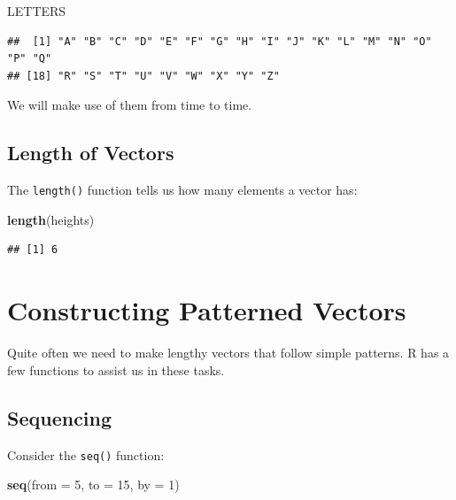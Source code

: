 \documentclass[]{book}
\makeatletter
\newenvironment{Shaded}{\begin{snugshade}}{\end{snugshade}}
\newcommand{\KeywordTok}[1]{\textcolor[rgb]{0.13,0.29,0.53}{\textbf{#1}}}
\newcommand{\DataTypeTok}[1]{\textcolor[rgb]{0.13,0.29,0.53}{#1}}
\newcommand{\DecValTok}[1]{\textcolor[rgb]{0.00,0.00,0.81}{#1}}
\newcommand{\NormalTok}[1]{#1}
\newenvironment{kframe}{%
\medskip{}
\setlength{\fboxsep}{.8em}
 \def\at@end@of@kframe{}%
 \ifinner\ifhmode%
  \def\at@end@of@kframe{\end{minipage}}%
  \begin{minipage}{\columnwidth}%
 \fi\fi%
 \def\FrameCommand##1{\hskip\@totalleftmargin \hskip-\fboxsep
 \colorbox{shadecolor}{##1}\hskip-\fboxsep
     \hskip-\linewidth \hskip-\@totalleftmargin \hskip\columnwidth}%
 \MakeFramed {\advance\hsize-\width
   \@totalleftmargin\z@ \linewidth\hsize
   \@setminipage}}%
 {\par\unskip\endMakeFramed%
 \at@end@of@kframe}
\renewenvironment{Shaded}{\begin{kframe}}{\end{kframe}}
\theoremstyle{definition}
\theoremstyle{definition}
\theoremstyle{definition}
\theoremstyle{remark}
\makeatother
\begin{document}
\begin{Shaded}
\begin{Highlighting}[]
\NormalTok{LETTERS}
\end{Highlighting}
\end{Shaded}

\begin{verbatim}
##  [1] "A" "B" "C" "D" "E" "F" "G" "H" "I" "J" "K" "L" "M" "N" "O" "P" "Q"
## [18] "R" "S" "T" "U" "V" "W" "X" "Y" "Z"
\end{verbatim}

We will make use of them from time to
time.

\subsection{Length of Vectors}\label{length-of-vectors}

The \texttt{length()}
function tells us how many
elements a vector has:

\begin{Shaded}
\begin{Highlighting}[]
\KeywordTok{length}\NormalTok{(heights)}
\end{Highlighting}
\end{Shaded}

\begin{verbatim}
## [1] 6
\end{verbatim}

\section{Constructing Patterned
Vectors}\label{constructing-patterned-vectors}

Quite often we need to make lengthy vectors that follow simple patterns.
R has a few functions to assist us in these tasks.

\subsection{Sequencing}\label{sequencing}

Consider the \texttt{seq()}
function:

\begin{Shaded}
\begin{Highlighting}[]
\KeywordTok{seq}\NormalTok{(}\DataTypeTok{from =} \DecValTok{5}\NormalTok{, }\DataTypeTok{to =} \DecValTok{15}\NormalTok{, }\DataTypeTok{by =} \DecValTok{1}\NormalTok{)}
\end{Highlighting}
\end{Shaded}
\end{document}
